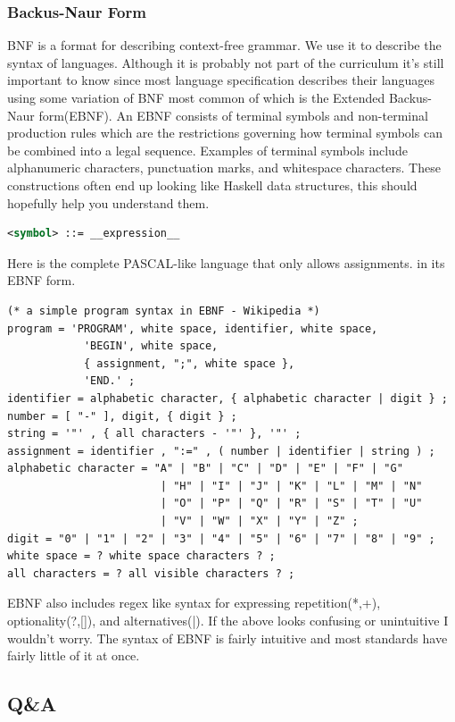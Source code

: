 \documentclass[tikz, border=5mm]{article}
\begin{document}
        \subsubsection{Backus-Naur Form}
            \gls{BNF} is a format for describing context-free grammar. We use it to describe the syntax of languages. Although it is probably not part of the curriculum
            it's still important to know since most language specification describes their languages using some variation of BNF most common of which is the Extended Backus-Naur form(EBNF).
            An EBNF consists of terminal symbols and non-terminal production rules which are the restrictions governing how terminal symbols can be combined into a legal sequence. 
            Examples of terminal symbols include alphanumeric characters, punctuation marks, and whitespace characters. These constructions often end up looking like Haskell data structures,
            this should hopefully help you understand them.
            \begin{lstlisting}[language=XML]
<symbol> ::= __expression__
            \end{lstlisting}
            Here is the complete PASCAL-like language that only allows assignments. in its EBNF form.
            \begin{lstlisting}[language=XML]
(* a simple program syntax in EBNF - Wikipedia *)
program = 'PROGRAM', white space, identifier, white space, 
            'BEGIN', white space, 
            { assignment, ";", white space }, 
            'END.' ;
identifier = alphabetic character, { alphabetic character | digit } ;
number = [ "-" ], digit, { digit } ;
string = '"' , { all characters - '"' }, '"' ;
assignment = identifier , ":=" , ( number | identifier | string ) ;
alphabetic character = "A" | "B" | "C" | "D" | "E" | "F" | "G"
                        | "H" | "I" | "J" | "K" | "L" | "M" | "N"
                        | "O" | "P" | "Q" | "R" | "S" | "T" | "U"
                        | "V" | "W" | "X" | "Y" | "Z" ;
digit = "0" | "1" | "2" | "3" | "4" | "5" | "6" | "7" | "8" | "9" ;
white space = ? white space characters ? ;
all characters = ? all visible characters ? ;
            \end{lstlisting}
            EBNF also includes regex like syntax for expressing repetition(*,+), optionality(?,[]), and alternatives(|).
            If the above looks confusing or unintuitive I wouldn't worry. The syntax of EBNF is fairly intuitive and most standards have fairly little of it at once.
        \subsection{Q\&A}
\end{document}
